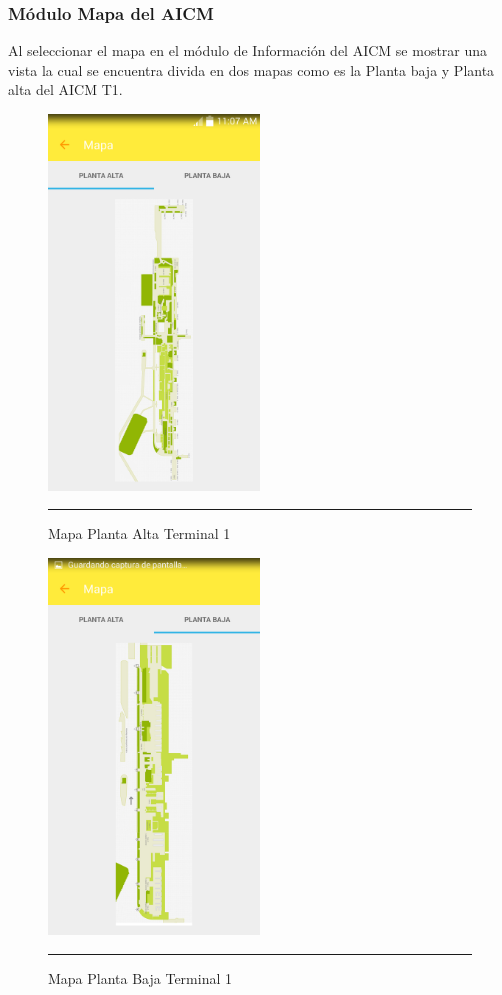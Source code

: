 \subsubsection{Módulo Mapa del AICM}
Al seleccionar el mapa en el módulo de Información del AICM se mostrar una vista la cual se encuentra divida en dos mapas como es la Planta baja y Planta alta del AICM T1.

\begin{figure}[h]
	\centering
		\includegraphics[width=0.5\textwidth]{Figuras/mapapa.png}
		\rule{30em}{0.5pt}
	\caption[Mapa Planta Alta Terminal 1]{Mapa Planta Alta Terminal 1}
	\label{fig:mapaPA}
\end{figure}

\begin{figure}[h]
	\centering
		\includegraphics[width=0.5\textwidth]{Figuras/mapapb.png}
		\rule{30em}{0.5pt}
	\caption[Mapa Planta Baja Terminal 1]{Mapa Planta Baja Terminal 1}
	\label{fig:mapaPB}
\end{figure}
\clearpage

